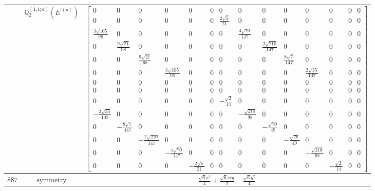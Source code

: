 \documentclass[fleqn,8pt,landscape]{jsarticle}
\begin{document}
\begin{longtable}{ccc}
$  $ & $ \mathbb{Q}_{2}^{(1,1;a)}(E^{\prime(a)}) $ & $ \begin{bmatrix} 0 & 0 & 0 & 0 & 0 & 0 & 0 & 0 & 0 & 0 & 0 & 0 & 0 & 0 \\ 0 & 0 & 0 & 0 & 0 & 0 & \frac{2 \sqrt{5}}{21} & 0 & 0 & 0 & 0 & 0 & 0 & 0 \\ \frac{3 \sqrt{105}}{98} & 0 & 0 & 0 & 0 & 0 & 0 & \frac{4 \sqrt{70}}{147} & 0 & 0 & 0 & 0 & 0 & 0 \\ 0 & \frac{9 \sqrt{21}}{98} & 0 & 0 & 0 & 0 & 0 & 0 & \frac{2 \sqrt{210}}{147} & 0 & 0 & 0 & 0 & 0 \\ 0 & 0 & \frac{9 \sqrt{21}}{98} & 0 & 0 & 0 & 0 & 0 & 0 & \frac{8 \sqrt{7}}{147} & 0 & 0 & 0 & 0 \\ 0 & 0 & 0 & \frac{3 \sqrt{105}}{98} & 0 & 0 & 0 & 0 & 0 & 0 & \frac{2 \sqrt{35}}{147} & 0 & 0 & 0 \\ 0 & 0 & 0 & 0 & 0 & 0 & 0 & 0 & 0 & 0 & 0 & 0 & 0 & 0 \\ 0 & 0 & 0 & 0 & 0 & 0 & 0 & 0 & 0 & 0 & 0 & 0 & 0 & 0 \\ 0 & 0 & 0 & 0 & 0 & 0 & - \frac{\sqrt{2}}{14} & 0 & 0 & 0 & 0 & 0 & 0 & 0 \\ - \frac{2 \sqrt{35}}{147} & 0 & 0 & 0 & 0 & 0 & 0 & - \frac{\sqrt{210}}{98} & 0 & 0 & 0 & 0 & 0 & 0 \\ 0 & - \frac{8 \sqrt{7}}{147} & 0 & 0 & 0 & 0 & 0 & 0 & - \frac{\sqrt{70}}{49} & 0 & 0 & 0 & 0 & 0 \\ 0 & 0 & - \frac{2 \sqrt{210}}{147} & 0 & 0 & 0 & 0 & 0 & 0 & - \frac{\sqrt{70}}{49} & 0 & 0 & 0 & 0 \\ 0 & 0 & 0 & - \frac{4 \sqrt{70}}{147} & 0 & 0 & 0 & 0 & 0 & 0 & - \frac{\sqrt{210}}{98} & 0 & 0 & 0 \\ 0 & 0 & 0 & 0 & - \frac{2 \sqrt{5}}{21} & 0 & 0 & 0 & 0 & 0 & 0 & - \frac{\sqrt{2}}{14} & 0 & 0 \end{bmatrix} $ \\ \hline
$ 887 $ & $ \text{symmetry} $ & $ \frac{\sqrt{6} x^{2}}{4} + \frac{\sqrt{6} i x y}{2} - \frac{\sqrt{6} y^{2}}{4} $ \\

\end{longtable}
\end{document}
